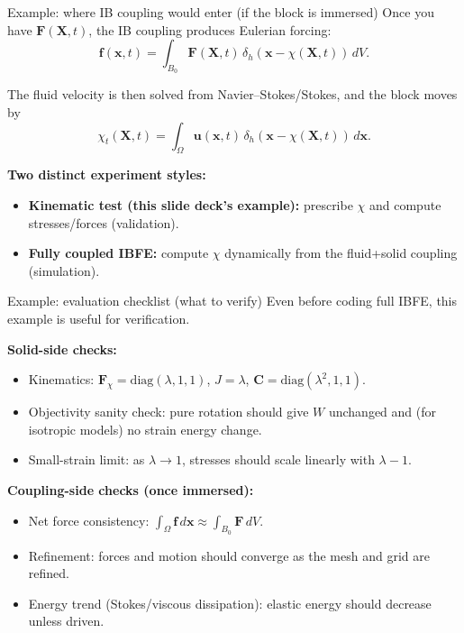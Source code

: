 \documentclass[aspectratio=169]{beamer}
\newcommand{\x}{\bm{x}}
\newcommand{\X}{\bm{X}}
\newcommand{\Cten}{\bm{C}}     %
\newcommand{\Fdef}{\bm{F}_{\chi}} %
\newcommand{\FLag}{\bm{F}}       %
\newcommand{\fEuler}{\bm{f}}     %
\newcommand{\uEuler}{\bm{u}}     %
\newcommand{\deltah}{\delta_h}   %
\begin{document}
\begin{frame}{Example: where IB coupling would enter (if the block is immersed)}
\small
Once you have \(\FLag(\X,t)\), the IB coupling produces Eulerian forcing:
\[
\fEuler(\x,t) = \int_{B_0} \FLag(\X,t)\,\deltah(\x-\chi(\X,t))\,dV.
\]

The fluid velocity is then solved from Navier--Stokes/Stokes, and the block moves by
\[
\chi_t(\X,t) = \int_{\Omega} \uEuler(\x,t)\,\deltah(\x-\chi(\X,t))\,d\x.
\]

\medskip
\textbf{Two distinct experiment styles:}
\begin{itemize}
\item \textbf{Kinematic test (this slide deck’s example):} prescribe \(\chi\) and compute stresses/forces (validation).
\item \textbf{Fully coupled IBFE:} compute \(\chi\) dynamically from the fluid+solid coupling (simulation).
\end{itemize}


\end{frame}

\begin{frame}{Example: evaluation checklist (what to verify)}
\small
Even before coding full IBFE, this example is useful for verification.

\medskip
\textbf{Solid-side checks:}
\begin{itemize}
\item Kinematics: \(\Fdef=\mathrm{diag}(\lambda,1,1)\), \(J=\lambda\), \(\Cten=\mathrm{diag}(\lambda^2,1,1)\).
\item Objectivity sanity check: pure rotation should give \(W\) unchanged and (for isotropic models) no strain energy change.
\item Small-strain limit: as \(\lambda\to 1\), stresses should scale linearly with \(\lambda-1\).
\end{itemize}

\medskip
\textbf{Coupling-side checks (once immersed):}
\begin{itemize}
\item Net force consistency: \(\int_{\Omega}\fEuler\,d\x \approx \int_{B_0}\FLag\,dV\).
\item Refinement: forces and motion should converge as the mesh and grid are refined.
\item Energy trend (Stokes/viscous dissipation): elastic energy should decrease unless driven.
\end{itemize}

\end{frame}
\end{document}
